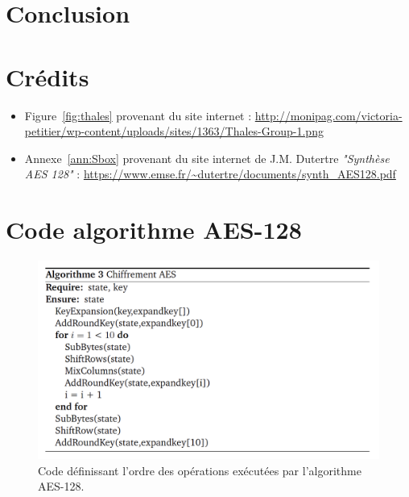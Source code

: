 \documentclass[10pt, oneside, a4paper]{article}
\begin{document}
\section{Conclusion}


\newpage
\pagebreak
{}
\section*{Crédits}

\begin{itemize}

\item Figure~\ref{fig:thales} provenant du site internet :
\url{http://monipag.com/victoria-petitier/wp-content/uploads/sites/1363/Thales-Group-1.png}

\item Annexe~\ref{ann:Sbox} provenant du site internet de J.M. Dutertre \textit{"Synthèse AES 128"} :
\url{https://www.emse.fr/~dutertre/documents/synth_AES128.pdf}

\end{itemize}


{}

\nocite{*}




\appendix
\clearpage
\section{Code algorithme AES-128}
\label{ann:AES}
\begin{figure}[!ht]
    \includegraphics[width=\linewidth]{image/CodeAES}
    \caption{Code définissant l'ordre des opérations exécutées par l'algorithme AES-128.}
    \label{fig:AESCode}
\end{figure}
\end{document}

